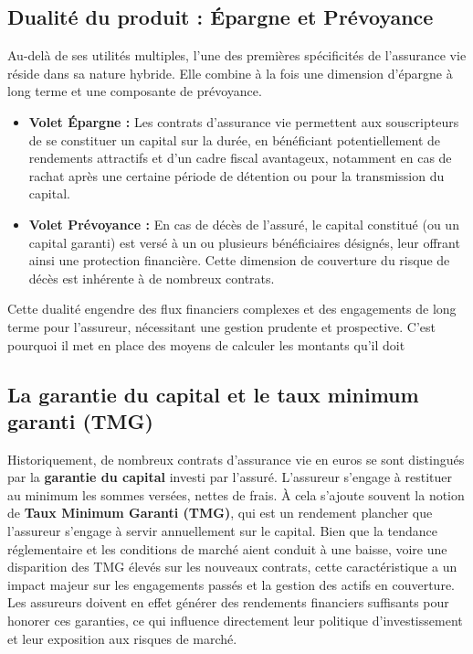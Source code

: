 \subsection{Dualité du produit : Épargne et Prévoyance}
\label{subsec:dualite_produit}
Au-delà de ses utilités multiples, l'une des premières spécificités de l'assurance vie réside dans sa nature hybride. Elle combine à la fois une dimension d'épargne à long terme et une composante de prévoyance. 
\begin{itemize}
    \item \textbf{Volet Épargne :} Les contrats d'assurance vie permettent aux souscripteurs de se constituer un capital sur la durée, en bénéficiant potentiellement de rendements attractifs et d'un cadre fiscal avantageux, notamment en cas de rachat après une certaine période de détention ou pour la transmission du capital.
    \item \textbf{Volet Prévoyance :} En cas de décès de l'assuré, le capital constitué (ou un capital garanti) est versé à un ou plusieurs bénéficiaires désignés, leur offrant ainsi une protection financière. Cette dimension de couverture du risque de décès est inhérente à de nombreux contrats.
\end{itemize}
Cette dualité engendre des flux financiers complexes et des engagements de long terme pour l'assureur, nécessitant une gestion prudente et prospective. C'est pourquoi il met en place des moyens de calculer les montants qu'il doit

\subsection{La garantie du capital et le taux minimum garanti (TMG)}
\label{subsec:garantie_capital_tmg}
Historiquement, de nombreux contrats d'assurance vie en euros se sont distingués par la \textbf{garantie du capital} investi par l'assuré. L'assureur s'engage à restituer au minimum les sommes versées, nettes de frais. 
À cela s'ajoute souvent la notion de \textbf{Taux Minimum Garanti (TMG)}, qui est un rendement plancher que l'assureur s'engage à servir annuellement sur le capital. Bien que la tendance réglementaire et les conditions de marché aient conduit à une baisse, voire une disparition des TMG élevés sur les nouveaux contrats, cette caractéristique a un impact majeur sur les engagements passés et la gestion des actifs en couverture. Les assureurs doivent en effet générer des rendements financiers suffisants pour honorer ces garanties, ce qui influence directement leur politique d'investissement et leur exposition aux risques de marché.

